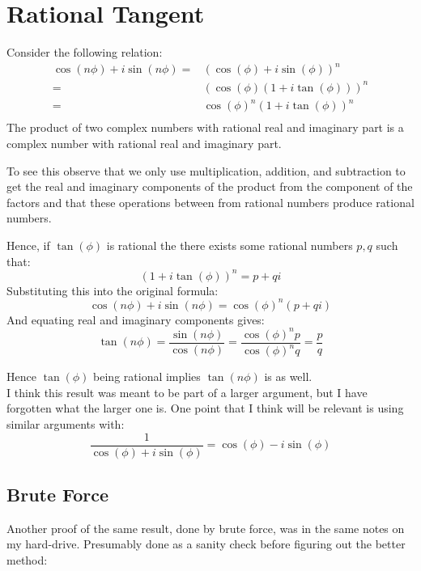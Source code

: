 \section{Rational Tangent}
Consider the following relation:
\begin{equation*}
\begin{aligned}
	\cos(n\phi)+i\sin(n\phi) =& (\cos(\phi)+i\sin(\phi))^{n} \\
	=&(\cos(\phi)(1+i\tan(\phi)))^n\\
	=&\cos(\phi)^n(1+i\tan(\phi))^n\\			
\end{aligned}
\end{equation*}
The product of two complex numbers with rational real and imaginary part is a complex number with rational real and imaginary part.

To see this observe that we only use multiplication, addition, and subtraction to get the real and imaginary components of the product from the component of the factors and that these operations between from rational numbers produce rational numbers.

Hence, if $\tan(\phi)$ is rational the there exists some rational numbers $p,q$ such that:
\[(1+i\tan(\phi))^n = p+qi\]
Substituting this into the original formula:
\[\cos(n\phi)+i\sin(n\phi) = \cos(\phi)^n(p+qi)\]
And equating real and imaginary components gives:
\[\tan(n\phi) = \frac{\sin(n\phi)}{\cos(n\phi)} = \frac{\cos(\phi)^np}{\cos(\phi)^nq} = \frac{p}{q}\]

Hence $\tan(\phi)$ being rational implies $\tan(n\phi)$ is as well.
\\

I think this result was meant to be part of a larger argument,
but I have forgotten what the larger one is.
One point that I think will be relevant is using similar arguments with:
\[\frac{1}{\cos(\phi)+i\sin(\phi)}= \cos(\phi)-i\sin(\phi)\]

\subsection{Brute Force}
Another proof of the same result, 
done by brute force,
was in the same notes on my hard-drive.
Presumably done as a sanity check before figuring out the better method:
\\

